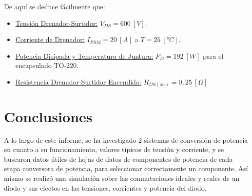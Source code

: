 \documentclass[12pt,a4paper]{article}
\begin{document}
De aquí se deduce fácilmente que:
\begin{itemize}
    \item \underline{Tensión Drenador-Surtidor:} $V_{DS} = 600 \ [V]$.
    \item \underline{Corriente de Drenador:} $I_{FSM} = 20 \ [A]$ a $T = 25 \ [°C]$.
    \item \underline{Potencia Disipada y Temperatura de Juntura:} $P_D = 192 \ [W]$ para el encapsulado TO-220.
    \item \underline{Resistencia Drenador-Surtidor Encendida:} $R_{DS(on)} = 0,25 \ [\Omega]$
\end{itemize}


\section{Conclusiones}
A lo largo de este informe, se ha investigado 2 sistemas de conversión de potencia en cuanto a su funcionamiento, valores típicos de tensión y corriente, y se buscaron datos útiles de hojas de datos de componentes de potencia de cada etapa conversora de potencia, para seleccionar correctamente un componente. Así mismo se realizó una simulación sobre las conmutaciones ideales y reales de un diodo y sus efectos en las tensiones, corrientes y potencia del diodo.
\end{document}
